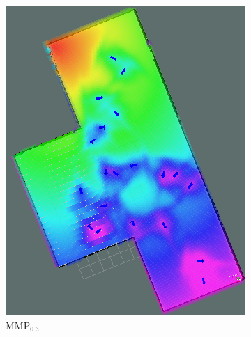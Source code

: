 \documentclass{article}  %
\begin{document}
\begin{figure}[tbh]
\begin{subfigure}[b]{0.292\columnwidth}
    \includegraphics[width=1.\textwidth]{images/astar03.png}
    \caption{MMP$_{0.3}$}
    \label{fig:astar03_cf}
   \end{subfigure}
  \begin{subfigure}[b]{0.296\columnwidth}

\end{subfigure}
\end{figure}
\end{document}
